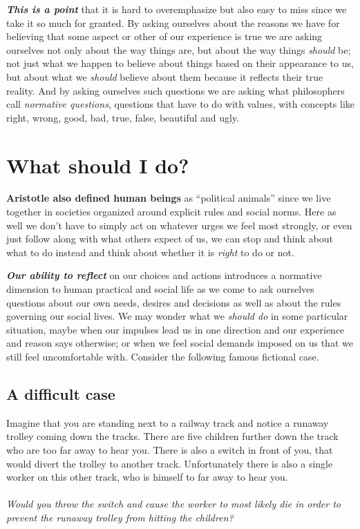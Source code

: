 \documentclass[12pt, openany]{book}
\makeatletter
\newenvironment{kframe}{%
\medskip{}
\setlength{\fboxsep}{.8em}
 \def\at@end@of@kframe{}%
 \ifinner\ifhmode%
  \def\at@end@of@kframe{\end{minipage}}%
  \begin{minipage}{\columnwidth}%
 \fi\fi%
 \def\FrameCommand##1{\hskip\@totalleftmargin \hskip-\fboxsep
 \colorbox{shadecolor}{##1}\hskip-\fboxsep
     \hskip-\linewidth \hskip-\@totalleftmargin \hskip\columnwidth}%
 \MakeFramed {\advance\hsize-\width
   \@totalleftmargin\z@ \linewidth\hsize
   \@setminipage}}%
 {\par\unskip\endMakeFramed%
 \at@end@of@kframe}
\newenvironment{rmdblock}[1]
  {
  \begin{itemize}
  \renewcommand{\labelitemi}{
    \raisebox{-.7\height}[0pt][0pt]{
      {\setkeys{Gin}{width=3em,keepaspectratio}\texttt{[image: img/\#1]}}
    }
  }
  \setlength{\fboxsep}{1em}
  \begin{kframe}
  \item
  }
  {
  \end{kframe}
  \end{itemize}
  }
\newenvironment{question}
  {\begin{rmdblock}{question}}
  {\end{rmdblock}}
\makeatother
\begin{document}
\textbf{\emph{This is a point}} that it is hard to overemphasize but also easy to miss since we take it so much for granted. By asking ourselves about the reasons we have for believing that some aspect or other of our experience is true we are asking ourselves not only about the way things are, but about the way things \emph{should} be; not just what we happen to believe about things based on their appearance to us, but about what we \emph{should} believe about them because it reflects their true reality. And by asking ourselves such questions we are asking what philosophers call \emph{normative questions}, questions that have to do with values, with concepts like right, wrong, good, bad, true, false, beautiful and ugly.

\hypertarget{what-should-i-do}{%
\section{What should I do?}\label{what-should-i-do}}

\textbf{Aristotle also defined human beings} as ``political animals'' since we live together in societies organized around explicit rules and social norms. Here as well we don't have to simply act on whatever urges we feel most strongly, or even just follow along with what others expect of us, we can stop and think about what to do instead and think about whether it is \emph{right} to do or not.

\textbf{\emph{Our ability to reflect}} on our choices and actions introduces a normative dimension to human practical and social life as we come to ask ourselves questions about our own needs, desires and decisions as well as about the rules governing our social lives. We may wonder what we \emph{should do} in some particular situation, maybe when our impulses lead us in one direction and our experience and reason says otherwise; or when we feel social demands imposed on us that we still feel uncomfortable with. Consider the following famous fictional case.

\hypertarget{a-difficult-case}{%
\subsection*{A difficult case}\label{a-difficult-case}}


\begin{question}

Imagine that you are standing next to a railway track and notice a runaway trolley coming down the tracks. There are five children further down the track who are too far away to hear you. There is also a switch in front of you, that would divert the trolley to another track. Unfortunately there is also a single worker on this other track, who is himself to far away to hear you.\\
~\\
\emph{Would you throw the switch and cause the worker to most likely die in order to prevent the runaway trolley from hitting the children?}

\end{question}
\end{document}
